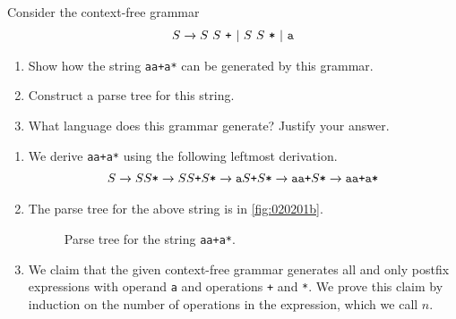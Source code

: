 \begin{exercise}\label{ex:020201}
    Consider the context-free grammar
    \begin{align*}
        {S} \xrightarrow{} S\ S\ \texttt{+}\ |\ S\ S\ \texttt{*}\ |\ \texttt{a}
    \end{align*}
    \begin{enumerate}[label=\alph*)]
        \item Show how the string \texttt{aa+a*} can be generated by this grammar.
        \item Construct a parse tree for this string.
        \item What language does this grammar generate? Justify your answer.
    \end{enumerate}
\end{exercise}
\begin{solution}\label{sol:020201}
    \begin{enumerate}[label=\alph*)]
        \item We derive \texttt{aa+a*} using the following leftmost derivation.
        \begin{align*}
            S \xrightarrow{} SS\texttt{*} 
            \xrightarrow{} SS\texttt{+}S\texttt{*}
            \xrightarrow{} \texttt{a}S\texttt{+}S\texttt{*}
            \xrightarrow{} \texttt{aa+}S\texttt{*}
            \xrightarrow{} \texttt{aa+a*}
        \end{align*}
        \item The parse tree for the above string is in \autoref{fig:020201b}.
        \begin{figure}[!ht]
            \centering
            \caption{Parse tree for the string \texttt{aa+a*}.}
            \label{fig:020201b}
        \end{figure}
        \item We claim that the given context-free grammar generates all and only 
        postfix expressions with operand \texttt{a} and operations \texttt{+} and 
        \texttt{*}. We prove this claim by induction on the number of operations
        in the expression, which we call $n$.
        

\end{enumerate}
\end{solution}
